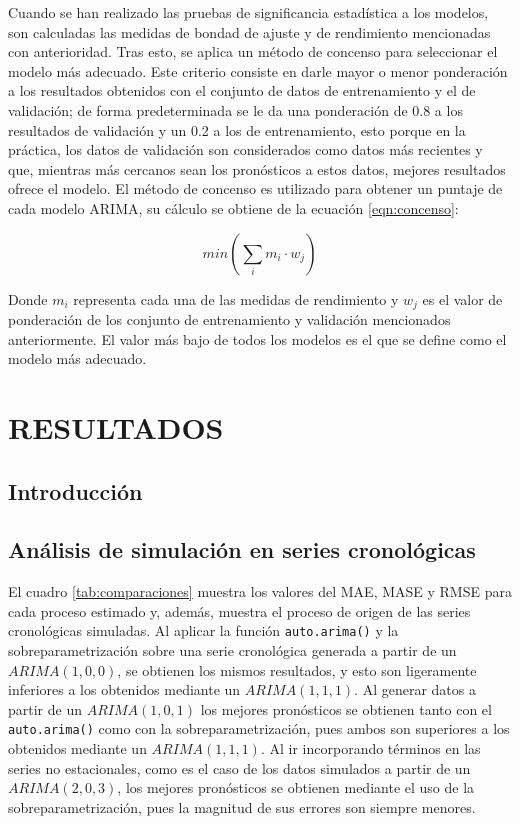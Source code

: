 \documentclass[
]{article}
\begin{document}
Cuando se han realizado las pruebas de significancia estadística a los
modelos, son calculadas las medidas de bondad de ajuste y de rendimiento
mencionadas con anterioridad. Tras esto, se aplica un método de concenso
para seleccionar el modelo más adecuado. Este criterio consiste en darle
mayor o menor ponderación a los resultados obtenidos con el conjunto de
datos de entrenamiento y el de validación; de forma predeterminada se le
da una ponderación de 0.8 a los resultados de validación y un 0.2 a los
de entrenamiento, esto porque en la práctica, los datos de validación
son considerados como datos más recientes y que, mientras más cercanos
sean los pronósticos a estos datos, mejores resultados ofrece el modelo.
El método de concenso es utilizado para obtener un puntaje de cada
modelo ARIMA, su cálculo se obtiene de la ecuación \ref{eqn:concenso}:

\begin{equation}
\label{eqn:concenso}
min\left( \sum_i {m_i}\cdot w_j \right)
\end{equation}

Donde \(m_i\) representa cada una de las medidas de rendimiento y
\(w_j\) es el valor de ponderación de los conjunto de entrenamiento y
validación mencionados anteriormente. El valor más bajo de todos los
modelos es el que se define como el modelo más adecuado.

\newpage

\section{RESULTADOS}

\subsection{Introducción}

\subsection{Análisis de simulación en series cronológicas}

El cuadro \ref{tab:comparaciones} muestra los valores del MAE, MASE y
RMSE para cada proceso estimado y, además, muestra el proceso de origen
de las series cronológicas simuladas. Al aplicar la función
\texttt{auto.arima()} y la sobreparametrización sobre una serie
cronológica generada a partir de un \(ARIMA(1,0,0)\), se obtienen los
mismos resultados, y esto son ligeramente inferiores a los obtenidos
mediante un \(ARIMA(1,1,1)\). Al generar datos a partir de un
\(ARIMA(1,0,1)\) los mejores pronósticos se obtienen tanto con el
\texttt{auto.arima()} como con la sobreparametrización, pues ambos son
superiores a los obtenidos mediante un \(ARIMA(1,1,1)\). Al ir
incorporando términos en las series no estacionales, como es el caso de
los datos simulados a partir de un \(ARIMA(2,0,3)\), los mejores
pronósticos se obtienen mediante el uso de la sobreparametrización, pues
la magnitud de sus errores son siempre menores.
\end{document}
